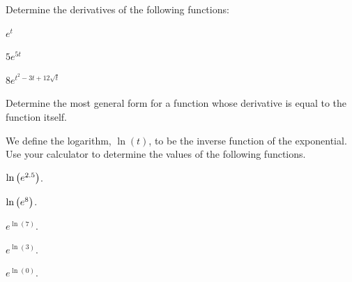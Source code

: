 \begin{problem}
\item Determine the derivatives of the following functions:
  \begin{subproblem}
  \item $e^{t}$
    \vfill
  \item $5e^{5t}$
    \vfill
  \item $8e^{t^2-3t+12\sqrt{t}}$
    \vfill
  \end{subproblem}
\item Determine the most general form for a function whose derivative
  is equal to the function itself.
  \vfill

\clearpage

\item We define the logarithm, $\ln(t)$, to be the inverse function of
  the exponential.  Use your calculator to determine the values of the
  following functions.
  \begin{subproblem}
  \item $\ln\left( e^{2.5} \right)$.
    \vfill
  \item $\ln\left( e^{8} \right)$.
    \vfill
  \item $e^{\ln(7)}$.
    \vfill
  \item $e^{\ln(3)}$.
    \vfill
  \item $e^{\ln(0)}$.
    \vfill
  \end{subproblem}



\end{problem}


